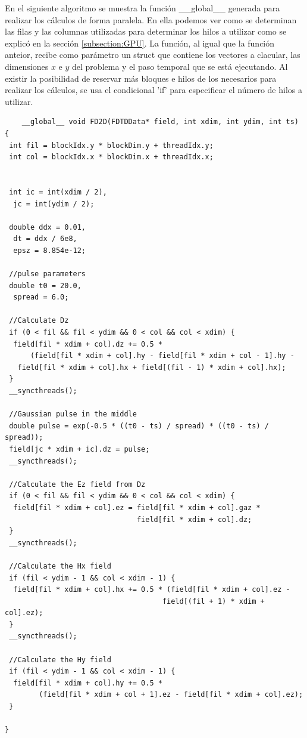 \documentclass[11pt,a4paper,twoside,pdf]{article}
\numberwithin{equation}{section}
\begin{document}
En el siguiente algoritmo se muestra la función \_\_global\_\_ generada para realizar los cálculos de forma paralela. En ella podemos ver como se determinan las filas y las columnas utilizadas para determinar los hilos a utilizar como se explicó en la sección \ref{subsection:GPU}. La función, al igual que la función anteior, recibe como parámetro un struct que contiene los vectores a clacular, las dimensiones $x$ e $y$ del problema y el paso temporal que se está ejecutando. Al existir la posibilidad de reservar más bloques e hilos de los necesarios para realizar los cálculos, se usa el condicional 'if' para especificar el número de hilos a utilizar.

\begin{verbatim}
    __global__ void FD2D(FDTDData* field, int xdim, int ydim, int ts)
{
 int fil = blockIdx.y * blockDim.y + threadIdx.y;
 int col = blockIdx.x * blockDim.x + threadIdx.x;


 int ic = int(xdim / 2),
  jc = int(ydim / 2);

 double ddx = 0.01,
  dt = ddx / 6e8,
  epsz = 8.854e-12;

 //pulse parameters
 double t0 = 20.0,
  spread = 6.0;

 //Calculate Dz
 if (0 < fil && fil < ydim && 0 < col && col < xdim) {
  field[fil * xdim + col].dz += 0.5 * 
      (field[fil * xdim + col].hy - field[fil * xdim + col - 1].hy -
   field[fil * xdim + col].hx + field[(fil - 1) * xdim + col].hx);
 }
 __syncthreads();

 //Gaussian pulse in the middle
 double pulse = exp(-0.5 * ((t0 - ts) / spread) * ((t0 - ts) / spread));
 field[jc * xdim + ic].dz = pulse;
 __syncthreads();

 //Calculate the Ez field from Dz
 if (0 < fil && fil < ydim && 0 < col && col < xdim) {
  field[fil * xdim + col].ez = field[fil * xdim + col].gaz * 
                               field[fil * xdim + col].dz;
 }
 __syncthreads();

 //Calculate the Hx field
 if (fil < ydim - 1 && col < xdim - 1) {
  field[fil * xdim + col].hx += 0.5 * (field[fil * xdim + col].ez - 
                                     field[(fil + 1) * xdim + col].ez);
 }
 __syncthreads();

 //Calculate the Hy field
 if (fil < ydim - 1 && col < xdim - 1) {
  field[fil * xdim + col].hy += 0.5 * 
        (field[fil * xdim + col + 1].ez - field[fil * xdim + col].ez);
 }

}
\end{verbatim}
\end{document}
